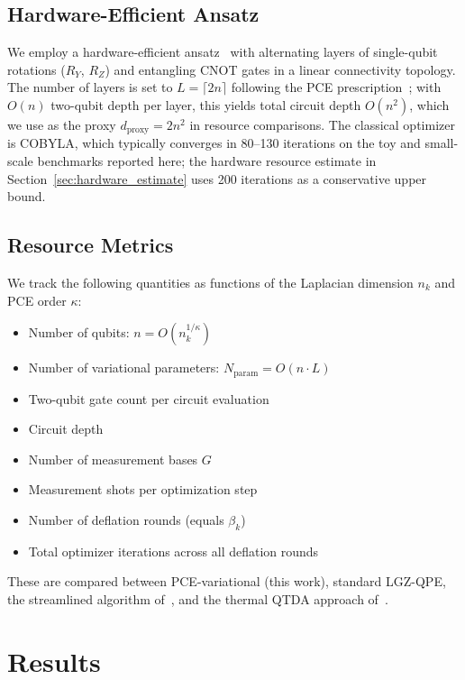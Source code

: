 \documentclass[conference,10pt]{IEEEtran}
\begin{document}
\subsection{Hardware-Efficient Ansatz}

We employ a hardware-efficient ansatz~\cite{Kandala17} with
alternating layers of single-qubit rotations ($R_Y$, $R_Z$) and
entangling CNOT gates in a linear connectivity topology. The number of
layers is set to $L = \lceil 2n \rceil$ following the PCE
prescription~\cite{Sciorilli24}; with $O(n)$ two-qubit depth per
layer, this yields total circuit depth $O(n^2)$, which we use as the
proxy $d_{\mathrm{proxy}} = 2n^2$ in resource comparisons. The
classical optimizer is COBYLA, which typically converges in
80--130 iterations on the toy and small-scale benchmarks reported here;
the hardware resource estimate in Section~\ref{sec:hardware_estimate}
uses 200 iterations as a conservative upper bound.

\subsection{Resource Metrics}

We track the following quantities as functions of the Laplacian
dimension $n_k$ and PCE order $\kappa$:
\begin{itemize}
    \item Number of qubits: $n = O(n_k^{1/\kappa})$
    \item Number of variational parameters:
          $N_{\mathrm{param}} = O(n \cdot L)$
    \item Two-qubit gate count per circuit evaluation
    \item Circuit depth
    \item Number of measurement bases $G$
    \item Measurement shots per optimization step
    \item Number of deflation rounds (equals $\beta_k$)
    \item Total optimizer iterations across all deflation rounds
\end{itemize}
These are compared between PCE-variational (this work), standard
LGZ-QPE, the streamlined algorithm of~\cite{McArdle22}, and the
thermal QTDA approach of~\cite{Scali24}.

\section{Results}\label{sec:results}
\end{document}
